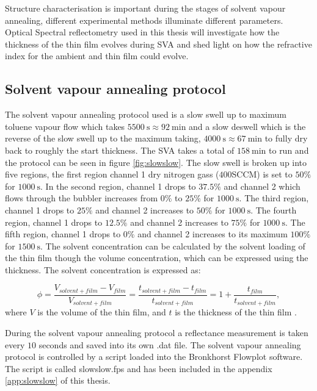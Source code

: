 \documentclass[MasterThesisMain.tex]{subfiles}
\begin{document}
Structure characterisation is important during the stages of solvent vapour annealing, different experimental methods illuminate different parameters. Optical Spectral reflectometry used in this thesis will investigate how the thickness of the thin film evolves during SVA and shed light on how the refractive index for the ambient and thin film could evolve. 


\subsection{Solvent vapour annealing protocol} \label{sec:svaprotocol}
The solvent vapour annealing protocol used is a slow swell up to maximum toluene vapour flow which takes $\SI{5500}{\second}\approx\SI{92}{\minute}$ and a slow deswell which is the reverse of the slow swell up to the maximum taking, $\SI{4000}{\second}\approx\SI{67}{\minute}$ to fully dry back to roughly the start thickness. The SVA takes a total of $\SI{158}{\minute}$ to run and the protocol can be seen in figure \ref{fig:slowslow}. The slow swell is broken up into five regions, the first region channel 1 dry nitrogen gass ($400$SCCM) is set to $50 \%$ for $\SI{1000}{\second}$. In the second region, channel 1 drops to $37.5 \%$ and channel 2 which flows through the bubbler increases from $0 \%$ to $25 \%$ for $\SI{1000}{\second}$. The third region, channel 1 drops to $25 \%$ and channel 2 increases to $50 \%$ for $\SI{1000}{\second}$. The fourth region, channel 1 drops to $12.5 \%$ and channel 2 increases to $75 \%$ for $\SI{1000}{\second}$. The fifth region, channel 1 drops to $0 \%$ and channel 2 increases to its maximum $100 \%$ for $\SI{1500}{\second}$. The solvent concentration can be calculated by the solvent loading of the thin film though the volume concentration, which can be expressed using the thickness. The solvent concentration is expressed as:

\begin{equation}\label{eq:solcon}
\phi= \frac{V_{solvent+film}-V_{film}}{V_{solvent+film}} = \frac{t_{solvent+film}-t_{film}}{t_{solvent+film}} = 1+\frac{t_{film}}{t_{solvent+film}}, 
\end{equation}
where $V$ is the volume of the thin film, and $t$ is the thickness of the thin film \cite{solventconcentration}.

During the solvent vapour annealing protocol a reflectance measurement is taken every $10$ seconds and saved into its own .dat file. The solvent vapour annealing protocol is controlled by a script loaded into the Bronkhorst Flowplot software. The script is called slowslow.fps and has been included in the appendix \ref{app:slowslow} of this thesis.
\end{document}

